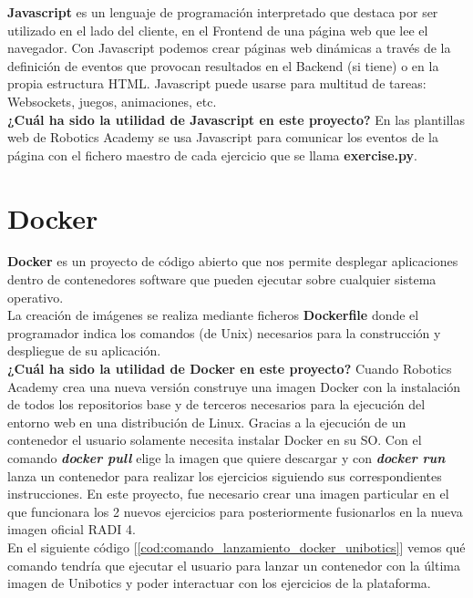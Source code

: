 \textbf{Javascript} es un lenguaje de programación interpretado que destaca por ser utilizado en el lado del cliente, en el Frontend de una página web que lee el navegador. Con Javascript podemos crear páginas web dinámicas a través de la definición de eventos que provocan resultados en el Backend (si tiene) o en la propia estructura HTML. Javascript puede usarse para multitud de tareas: Websockets, juegos, animaciones, etc.\\

\textbf{¿Cuál ha sido la utilidad de Javascript en este proyecto?}
En las plantillas web de Robotics Academy se usa Javascript para comunicar los eventos de la página con el fichero maestro de cada ejercicio que se llama \textbf{exercise.py}.



\section{Docker}
\label{sec:docker}

\textbf{Docker} \cite{documentacion_docker} es un proyecto de código abierto que nos permite desplegar aplicaciones dentro de contenedores software que pueden ejecutar sobre cualquier sistema operativo.\\

La creación de imágenes se realiza mediante ficheros \textbf{Dockerfile} donde el programador indica los comandos (de Unix) necesarios para la construcción y despliegue de su aplicación.\\

\textbf{¿Cuál ha sido la utilidad de Docker en este proyecto?} Cuando Robotics Academy crea una nueva versión construye una imagen Docker con la instalación de todos los repositorios base y de terceros necesarios para la ejecución del entorno web en una distribución de Linux. Gracias a la ejecución de un contenedor el usuario solamente necesita instalar Docker en su SO. Con el comando \textbf{\textit{docker pull}} elige la imagen que quiere descargar y con \textbf{\textit{docker run}} lanza un contenedor para realizar los ejercicios siguiendo sus correspondientes instrucciones. En este proyecto, fue necesario crear una imagen particular en el que funcionara los 2 nuevos ejercicios para posteriormente fusionarlos en la nueva imagen oficial RADI 4.\\

En el siguiente código [\ref{cod:comando_lanzamiento_docker_unibotics}] vemos qué comando tendría que ejecutar el usuario para lanzar un contenedor con la última imagen de Unibotics y poder interactuar con los ejercicios de la plataforma.\\

